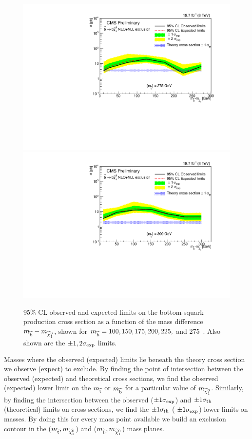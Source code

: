 \begin{figure}[!Hhtb]
\begin{center}
  \includegraphics[scale=0.39]{Figures/sus13009/limitplots/plots/sbottom/Limit_DM_sbottom_275.pdf}
    \includegraphics[scale=0.39]{Figures/sus13009/limitplots/plots/sbottom/Limit_DM_sbottom_300.pdf}
  \caption{95\% \ac{CL} observed and expected limits on the bottom-squark production cross section as a function of the mass difference $m_{\widetilde{{\rm b}}} - m_{\widetilde{\chi}^{0}_{1}}$, shown for $m_{\widetilde{{\rm b}}} = 100, 150, 175, 200, 225,$ and 275~\GeV. 
  Also shown are the $\pm 1, 2 \sigma_{\rm exp}$ limits. 
 }
  \label{fig:sbottom_limits}
  \end{center}
\end{figure}




Masses where the observed (expected) limits lie beneath the theory cross section we observe (expect) to exclude.
By finding the point of intersection between the observed (expected) and theoretical cross sections, we find the observed (expected) lower limit on the $m_{\widetilde{{\rm t}}}$ or $m_{\widetilde{{\rm b}}}$ for a particular value of $m_{\widetilde{\chi}^{0}_{1}}$.
Similarly, by finding the intersection between the observed ($\pm 1 \sigma_{\rm exp}$) and $\pm 1 \sigma_{\rm th}$ (theoretical) limits on cross sections, we find the $\pm 1 \sigma_{\rm th}$ ( $\pm 1  \sigma_{\rm exp}$) lower limits on masses.
By doing this for every mass point available we build an exclusion contour in the ($m_{\widetilde{{\rm t}}},m_{\widetilde{\chi}^{0}_{1}}$) and ($m_{\widetilde{{\rm b}}},m_{\widetilde{\chi}^{0}_{1}}$) mass planes.

